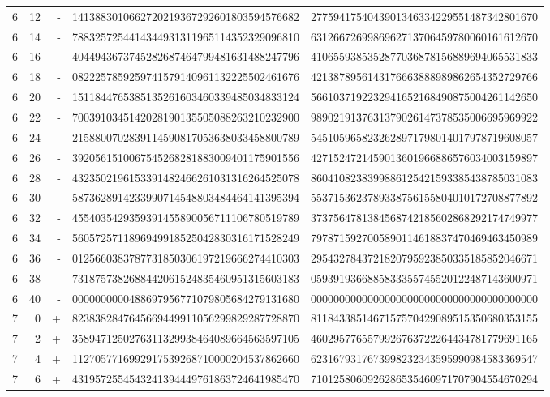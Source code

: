 \begin{longtable}{rrrll}
6 & 12 & - & 1413883010662720219367292601803594576682 & 2775941754043901346334229551487342801670 \\
6 & 14 & - & 7883257254414344931311965114352329096810 & 6312667269986962713706459780060161612670 \\
6 & 16 & - & 4044943673745282687464799481631488247796 & 4106559385352877036878156889694065531833 \\
6 & 18 & - & 0822257859259741579140961132225502461676 & 4213878956143176663888989862654352729766 \\
6 & 20 & - & 1511844765385135261603460339485034833124 & 5661037192232941652168490875004261142650 \\
6 & 22 & - & 7003910345142028190135505088263210232900 & 9890219137631379026147378535006695969922 \\
6 & 24 & - & 2158800702839114590817053638033458800789 & 5451059658232628971798014017978719608057 \\
6 & 26 & - & 3920561510067545268281883009401175901556 & 4271524721459013601966886576034003159897 \\
6 & 28 & - & 4323502196153391482466261031316264525078 & 8604108238399886125421593385438785031083 \\
6 & 30 & - & 5873628914233990714548803484464141395394 & 5537153623789338756155804010172708877892 \\
6 & 32 & - & 4554035429359391455890056711106780519789 & 3737564781384568742185602868292174749977 \\
6 & 34 & - & 5605725711896949918525042830316171528249 & 7978715927005890114618837470469463450989 \\
6 & 36 & - & 0125660383787731850306197219666274410303 & 2954327843721820795923850335185852046671 \\
6 & 38 & - & 7318757382688442061524835460951315603183 & 0593919366885833355745520122487143600971 \\
6 & 40 & - & 0000000000488697956771079805684279131680 & 0000000000000000000000000000000000000000 \\
7 & 0 & + & 8238382847645669449911056299829287728870 & 8118433851467157570429089515350680353155 \\
7 & 2 & + & 3589471250276311329938464089664563597105 & 4602957765579926763722264434781779691165 \\
7 & 4 & + & 1127057716992917539268710000204537862660 & 6231679317673998232343595990984583369547 \\
7 & 6 & + & 4319572554543241394449761863724641985470 & 7101258060926286535460971707904554670294 \\

\end{longtable}
